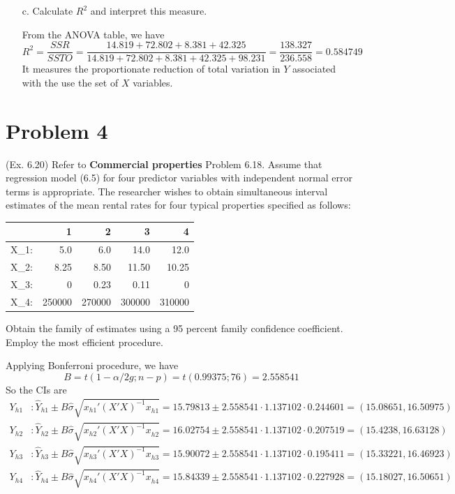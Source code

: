 \documentclass[10pt]{report}
\begin{document}
\begin{enumerate}
	\item [c.]
	Calculate $R^2$ and interpret this measure.
	
	From the ANOVA table, we have
	\[
	R^2 = \frac{SSR}{SSTO} = \frac{14.819+72.802+8.381+42.325}{14.819+72.802+8.381+42.325+98.231} = \frac{138.327}{236.558} = 0.584749
	\]
	It measures the proportionate reduction of total variation in $Y$ associated with the use the set of $X$ variables.
\end{enumerate}

\section*{Problem 4}
(Ex. 6.20) Refer to \textbf{Commercial properties} Problem 6.18. Assume that regression model (6.5) for four predictor variables with independent normal error terms is appropriate. The researcher wishes to obtain simultaneous interval estimates of the mean rental rates for four typical properties specified as follows:
\begin{table}[H]
	\centering
	\begin{tabular}{*{5}{N}}
		& 1 & 2 & 3 & 4 \\ \midrule
		X_1: & 5.0 & 6.0 & 14.0 & 12.0 \\
		X_2: & 8.25 & 8.50 & 11.50 & 10.25 \\
		X_3: & 0 & 0.23 & 0.11 & 0 \\
		X_4: & 250000 & 270000 & 300000 & 310000 \\
	\end{tabular}
\end{table}
Obtain the family of estimates using a 95 percent family confidence coefficient. Employ the most efficient procedure.

Applying Bonferroni procedure, we have 
\[
B = t(1-\alpha/2g; n-p) = t(0.99375; 76) = 2.558541
\]
So the CIs are
\begin{align*}
	Y_{h1} &: \hat{Y}_{h1} \pm B\hat{\sigma} \sqrt{x_{h1}' (X'X)^{-1} x_{h1}^{}} = 15.79813 \pm 2.558541 \cdot 1.137102 \cdot 0.244601 = (15.08651, 16.50975)\\
	Y_{h2} &: \hat{Y}_{h2} \pm B\hat{\sigma} \sqrt{x_{h2}' (X'X)^{-1} x_{h2}^{}} = 16.02754 \pm 2.558541 \cdot 1.137102 \cdot 0.207519 = (15.4238, 16.63128)\\
	Y_{h3} &: \hat{Y}_{h3} \pm B\hat{\sigma} \sqrt{x_{h3}' (X'X)^{-1} x_{h3}^{}} = 15.90072 \pm 2.558541 \cdot 1.137102 \cdot 0.195411 = (15.33221, 16.46923)\\
	Y_{h4} &: \hat{Y}_{h4} \pm B\hat{\sigma} \sqrt{x_{h4}' (X'X)^{-1} x_{h4}^{}} = 15.84339 \pm 2.558541 \cdot 1.137102 \cdot 0.227928 = (15.18027, 16.50651)
\end{align*}
\end{document}
